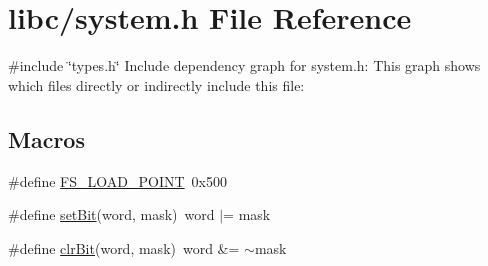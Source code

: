 \hypertarget{a00134}{}\section{libc/system.h File Reference}
\label{a00134}
{\ttfamily \#include \char`\"{}types.\+h\char`\"{}}\newline
Include dependency graph for system.\+h\+:
This graph shows which files directly or indirectly include this file\+:
\subsection*{Macros}
\begin{DoxyCompactItemize}
\item 
\#define \hyperlink{a00134_ade5f4f9306a7cacc0cb2a518bd97e237_ade5f4f9306a7cacc0cb2a518bd97e237}{F\+S\+\_\+\+L\+O\+A\+D\+\_\+\+P\+O\+I\+NT}~0x500
\item 
\#define \hyperlink{a00134_a3c47e49052cc52d10755358512c10135_a3c47e49052cc52d10755358512c10135}{set\+Bit}(word,  mask)~word $\vert$= mask
\item 
\#define \hyperlink{a00134_ab6ca194e33920928b4bdeff67bf0edec_ab6ca194e33920928b4bdeff67bf0edec}{clr\+Bit}(word,  mask)~word \&= $\sim$mask
\end{DoxyCompactItemize}
